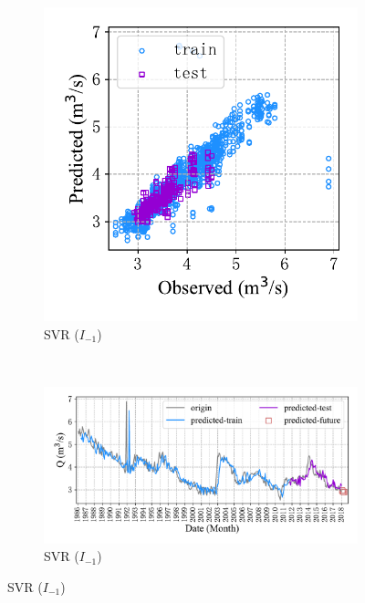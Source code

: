 \begin{figure}[!htbp]
  \centering
  \begin{subfigure}[b]{0.305\textwidth}
    \includegraphics[width=\textwidth]{Img/chap4_spr/out4/spr_scatter_in_1_out_4_svr.pdf}
    \vspace{-1.2cm}
    \caption{SVR ($I_{-1}$)}
    \label{fig:spr_scatter_in_1_out_4_svr}
  \end{subfigure}
  ~
  \begin{subfigure}[b]{0.615\textwidth}
    \includegraphics[width=\textwidth]{Img/chap4_spr/out4/spr_series_in_1_out_4_svr.pdf}
    \vspace{-1.2cm}
    \caption{SVR ($I_{-1}$)}
    \label{fig:spr_series_in_1_out_4_svr}

\end{subfigure}
\end{figure}
